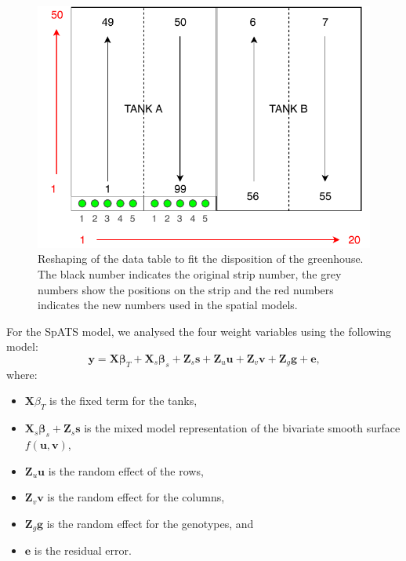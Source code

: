 \begin{figure}[hbtp]
	\centering
	\includegraphics[scale = 0.7]{figures/TANK_repartition.pdf}
	\caption[Reshaping of the data table to fit the disposition of the greenhouse]{Reshaping of the data table to fit the 
	disposition of the greenhouse. The black number indicates the original strip number, the grey numbers show the positions on 
	the strip and the red numbers indicates the new 
	numbers used in the spatial models.}
	\label{fig:tank_disposition}	
\end{figure}

For the SpATS model, we analysed the four weight variables using the following model:
\begin{equation}
	\mathbf{y} =\mathbf{X} \boldsymbol{\beta}_{T} +\mathbf{X}_{s} \boldsymbol{\beta}_{s}+\mathbf{Z}_{s} \mathbf{s}+\mathbf{Z}_{u} \mathbf{u}
	+ \mathbf{Z}_{v} \mathbf{v} + \mathbf{Z}_{g} \mathbf{g}+ \mathbf{e} \text{,}
\end{equation}
where:
\begin{itemize}
	\item $\mathbf{X} \beta_{T}$ is the fixed term for the tanks,
	\item $\mathbf{X}_{s} \boldsymbol{\beta}_{s}+\mathbf{Z}_{s} \mathbf{s}$ is the mixed model representation of the bivariate smooth surface $f(\mathbf{u},\mathbf{v})$,
	\item $\mathbf{Z}_{u} \mathbf{u}$ is the random effect of the rows,
	\item $\mathbf{Z}_{v} \mathbf{v}$ is the random effect for the columns,
	\item $\mathbf{Z}_{g} \mathbf{g}$ is the random effect for the genotypes, and 
	\item $\mathbf{e}$ is the residual error.
\end{itemize}


